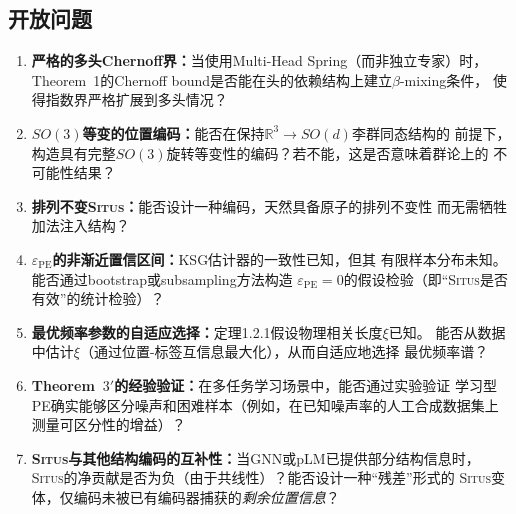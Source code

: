 \documentclass[11pt,a4paper]{article}
\theoremstyle{remark}
\DeclareMathOperator{\PE}{PE}
\newcommand{\R}{\mathbb{R}}
\newcommand{\Situs}{\textsc{Situs}}
\begin{document}
\subsection{开放问题}

\begin{enumerate}[label=(\arabic*), leftmargin=*]

    \item \textbf{严格的多头Chernoff界：}当使用Multi-Head Spring（而非独立专家）时，
          Theorem~1的Chernoff bound是否能在头的依赖结构上建立$\beta$-mixing条件，
          使得指数界严格扩展到多头情况？\cite{scx2026cc_audit}

    \item \textbf{$SO(3)$等变的位置编码：}能否在保持$\R^3 \to SO(d)$李群同态结构的
          前提下，构造具有完整$SO(3)$旋转等变性的编码？若不能，这是否意味着群论上的
          不可能性结果？

    \item \textbf{排列不变\Situs{}：}能否设计一种编码，天然具备原子的排列不变性
          而无需牺牲加法注入结构？

    \item \textbf{$\varepsilon_{\PE}$的非渐近置信区间：}KSG估计器的一致性已知，但其
          有限样本分布未知。能否通过bootstrap或subsampling方法构造
          $\varepsilon_{\PE} = 0$的假设检验（即``\Situs{}是否有效''的统计检验）？

    \item \textbf{最优频率参数的自适应选择：}定理1.2.1假设物理相关长度$\xi$已知。
          能否从数据中估计$\xi$（通过位置-标签互信息最大化），从而自适应地选择
          最优频率谱？

    \item \textbf{Theorem~$3'$的经验验证：}在多任务学习场景中，能否通过实验验证
          学习型PE确实能够区分噪声和困难样本（例如，在已知噪声率的人工合成数据集上
          测量可区分性的增益）？

    \item \textbf{\Situs{}与其他结构编码的互补性：}当GNN或pLM已提供部分结构信息时，
          \Situs{}的净贡献是否为负（由于共线性）？能否设计一种``残差''形式的
          \Situs{}变体，仅编码未被已有编码器捕获的\emph{剩余位置信息}？

\end{enumerate}

\end{document}
